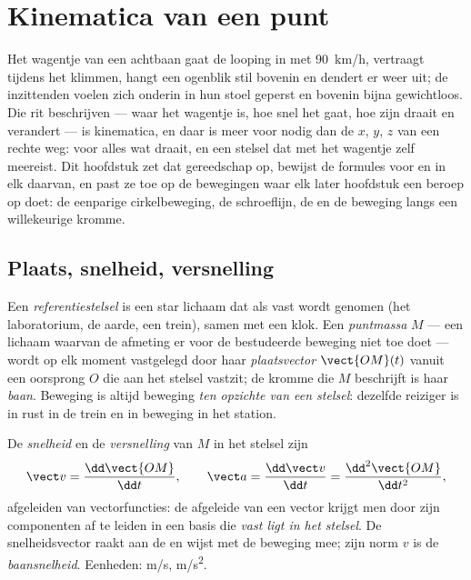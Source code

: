 \chapter{Kinematica van een punt}\label{ch:b1:point-kinematics}

Het wagentje van een achtbaan gaat de looping in met \qty{90}{km/h}, vertraagt
tijdens het klimmen, hangt een ogenblik stil bovenin en dendert er weer uit;
de inzittenden voelen zich onderin in hun stoel geperst en bovenin bijna
gewichtloos. Die rit beschrijven --- waar het wagentje is, hoe
snel het gaat, hoe zijn  draait en verandert --- is kinematica,
en daar is meer voor nodig dan de $x$, $y$, $z$ van een rechte weg:
 voor alles wat draait, en een stelsel dat met het wagentje
zelf meereist. Dit hoofdstuk zet dat gereedschap op, bewijst de formules voor
 en  in elk daarvan, en past ze toe op de
bewegingen waar elk later hoofdstuk een beroep op doet: de eenparige cirkelbeweging, de
schroeflijn, de  en de beweging langs een willekeurige kromme.

\section{Plaats, snelheid, versnelling}

\begin{definition}\label{def:b1:point-kinematics:frame}
Een \emph{referentiestelsel} is een star lichaam dat als vast wordt genomen (het
laboratorium, de aarde, een trein), samen met een klok. Een \emph{puntmassa}
$M$ --- een lichaam waarvan de afmeting er voor de bestudeerde beweging niet toe doet
--- wordt op elk moment vastgelegd door haar \emph{plaatsvector}
$\vect{OM}(t)$ vanuit een oorsprong $O$ die aan het stelsel vastzit; de kromme
die $M$ beschrijft is haar \emph{baan}. Beweging is altijd beweging
\emph{ten opzichte van een stelsel}: dezelfde reiziger is in rust in de trein
en in beweging in het station.
\end{definition}

\begin{definition}\label{def:b1:point-kinematics:velocity}
De \emph{snelheid} en de \emph{versnelling} van $M$ in het stelsel zijn
\[
\vect v = \frac{\dd\vect{OM}}{\dd t}, \qquad
\vect a = \frac{\dd\vect v}{\dd t} = \frac{\dd^2\vect{OM}}{\dd t^2},
\]
afgeleiden van vectorfuncties: de afgeleide van een vector krijgt men
door zijn componenten af te leiden in een basis die \emph{vast ligt in het
stelsel}. De snelheidsvector raakt aan de 
en wijst met de beweging mee; zijn norm $v$ is de \emph{baansnelheid}. Eenheden:
\unit{m/s}, \unit{m/s^2}.
\end{definition}

